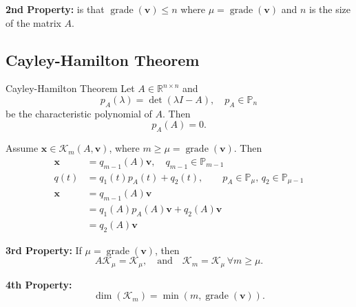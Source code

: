 \textbf{2nd Property:}
is that $\operatorname{grade}(\mathbf{v}) \leq n$ where $\mu = \operatorname{grade}(\mathbf{v})$ and $n$ is the size of the matrix $A$.

\subsection{Cayley-Hamilton Theorem}
\begin{theorem}{Cayley-Hamilton Theorem}{}
    Let $A \in \mathbb{R}^{n \times n}$ and
    \[
        p_A(\lambda) = \det(\lambda I - A), \quad p_A \in \mathbb{P}_n
    \]
    be the characteristic polynomial of $A$. Then
    \[
        p_A(A) = 0.
    \]
\end{theorem}

Assume $\mathbf{x} \in \mathcal{K}_m(A, \mathbf{v})$, where $m \geq \mu = \operatorname{grade}(\mathbf{v})$. Then
\begin{align*}
    \mathbf{x} & = q_{m-1}(A)\mathbf{v}, \quad q_{m-1} \in \mathbb{P}_{m-1}                                                                   \\
    q(t)       & = q_1(t) p_A(t) + q_2(t), \qquad p_A \in \mathbb{P}_{\mu}, \, q_2 \in \mathbb{P}_{\mu-1}                            \\
    \mathbf{x} & = q_{m-1}(A)\mathbf{v}\\
    &= q_1(A) p_A(A) \mathbf{v} + q_2(A) \mathbf{v} \\
    &= q_2(A) \mathbf{v}
\end{align*}

\textbf{3rd Property:}
If $\mu = \operatorname{grade}(\mathbf{v})$, then
\[
    A\mathcal{K}_\mu = \mathcal{K}_\mu, \quad \text{and} \quad \mathcal{K}_m = \mathcal{K}_\mu \, \forall m \geq \mu.
\]

\textbf{4th Property:}
\[
    \dim(\mathcal{K}_m) = \min(m, \operatorname{grade}(\mathbf{v})).
\]

